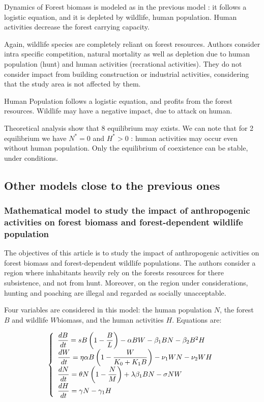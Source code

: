 \documentclass{article}
\begin{document}
Dynamics of Forest biomass is modeled as in the previous model : it follows a logistic equation, and it is depleted by wildlife, human population. Human activities decrease the forest carrying capacity.

Again, wildlife species are completely reliant on forest resources. Authors consider intra specific competition, natural mortality as well as depletion due to human population (hunt) and human activities (recrational activities). They do not consider impact from building construction or industrial activities, considering that the study area is not affected by them.

Human Population follows a logistic equation, and profits from the forest resources. Wildlife may have a negative impact, due to attack on human.

Theoretical analysis show that 8 equilibrium may exists. We can note that for 2 equilibrium we have $N^* = 0$ and $H^* > 0$ : human activities may occur even without human population. Only the equilibrium of coexistence can be stable, under conditions.


\subsection{Other models close to the previous ones}

\subsubsection{Mathematical model to study the impact of anthropogenic activities on forest biomass and forest-dependent wildlife population \cite{fanuel_mathematical_2024}}

The objectives of this article is to study the impact of anthropogenic activities on forest biomass and forest-dependent wildlife populations. The authors consider a region where inhabitants heavily rely on the forests resources for there subsistence, and not from hunt. Moreover, on the region under considerations, hunting and poaching are illegal and regarded as socially unacceptable.

Four variables are considered in this model: the human population $N$, the forest $B$ and wildlife $W$biomass, and the human activities $H$. Equations are:

\begin{equation}
\def\arraystrech{2}
\left\lbrace \begin{array}{l}
\dfrac{dB}{dt} =  sB \left(1-\dfrac{B}{L}\right) - \alpha BW -\beta_1 BN - \beta_2 B^2 H  \\
\dfrac{dW}{dt} =  \eta \alpha B \left(1-\dfrac{W}{K_0 + K_1 B}\right)  -\nu_1 WN - \nu_2 WH\\
\dfrac{dN}{dt} = \theta N \left(1 - \dfrac{N}{M} \right) + \lambda \beta_1 BN - \sigma NW \\
\dfrac{dH}{dt} = \gamma N - \gamma_1 H
\end{array} \right.
\end{equation}
\end{document}
